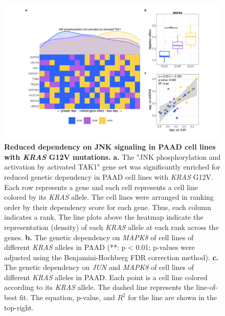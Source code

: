 \documentclass[english, 10pt, letterpaper]{article}
\newcommand{\KRAS}{\emph{KRAS}}
\begin{document}
\begin{figure}[h!]
\centering
\includegraphics[width=180mm]{figures/Supp_Fig_9.jpeg}
\caption{
    \textbf{Reduced dependency on JNK signaling in PAAD cell lines with \KRAS{} G12V mutations.}
    \textbf{a.} The "JNK phosphorylation and activation by activated TAK1" gene set was significantly enriched for reduced genetic dependency in PAAD cell lines with \KRAS{} G12V. Each row represents a gene and each cell represents a cell line colored by its \KRAS{} allele. The cell lines were arranged in ranking order by their dependency score for each gene. Thus, each column indicates a rank. The line plots above the heatmap indicate the representation (density) of each \KRAS{} allele at each rank across the genes.
    \textbf{b.} The genetic dependency on \emph{MAPK8} of cell lines of different \KRAS{} alleles in PAAD (**: p < 0.01; p-values were adjusted using the Benjamini-Hochberg FDR correction method).
    \textbf{c.} The genetic dependency on \emph{JUN} and \emph{MAPK8} of cell lines of different \KRAS{} alleles in PAAD. Each point is a cell line colored according to its \KRAS{} allele. The dashed line represents the line-of-best fit. The equation, p-value, and $R^2$ for the line are shown in the top-right.
}
\label{sfig:paad-dependency-JUN}
\end{figure}
\newpage
\end{document}
